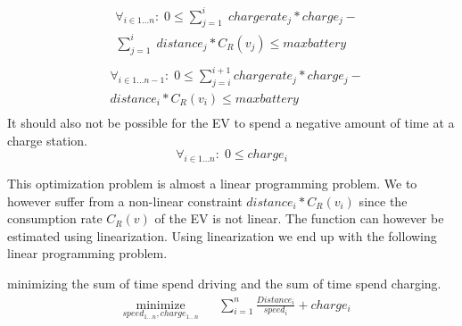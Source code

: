 \begin{equation}
\begin{aligned}
& \forall_{i \in 1 \dots n}: \; 0 \leq \sum_{j=1}^{i} \; chargerate_j*charge_j - \\
&  \sum_{j=1}^{i} \; distance_j*C_R(v_j) \leq maxbattery \\
 \end{aligned}
\end{equation}
\begin{equation}
\begin{aligned}
& \forall_{i \in 1 \dots n-1}: \; 0 \leq \sum_{j=i}^{i+1} chargerate_j*charge_j - \\
&   distance_i*C_R(v_i) \leq maxbattery \\
 \end{aligned}
\end{equation}
It should also not be possible for the EV to spend a negative amount of time at a charge station.
\begin{equation}
\forall_{i \in 1 \dots n}: \; 0 \leq charge_i 
\end{equation}

This optimization problem is almost a linear programming problem. We to however suffer from a non-linear constraint $distance_i*C_R(v_i)$ since the consumption rate $C_R(v)$ of the EV is not linear. The function can however be estimated using linearization. Using linearization we end up with the following linear programming problem.  
 
minimizing the sum of time spend driving and the sum of time spend charging. 
\begin{equation}
\begin{aligned}
 & \underset{speed_{1 \dots n},charge_{1 \dots n}}
{\text{minimize}}
& & \sum_{i=1}^{n} \frac{Distance_i}{speed_i} + charge_i \\
\end{aligned}
\end{equation}\label{eq:objfunction}

